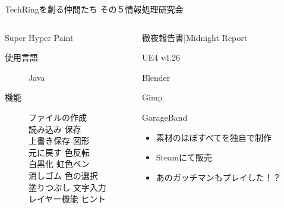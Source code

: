 \documentclass[dvipdfmx]{beamer}
\begin{document}
\begin{frame}{TechRingを創る仲間たち その５}{情報処理研究会}
  \begin{columns}
    \begin{column}{0.48\textwidth}
      \begin{alertblock}{Super Hyper Paint}
        \begin{footnotesize}
          \begin{description}
            \item[使用言語] Java
            \item[機能] ファイルの作成\\読み込み 保存\\上書き保存 図形\\
            元に戻す 色反転\\白黒化 虹色ペン\\消しゴム 色の選択\\塗りつぶし 文字入力\\レイヤー機能 ヒント
          \end{description}
        \end{footnotesize}
      \end{alertblock}
    \end{column}
    \begin{column}{0.48\textwidth}
      \begin{alertblock}{徹夜報告書|Midnight Report}
        \begin{footnotesize}
          \begin{description}[ゲームエンジン]
            \item[ゲームエンジン] UE4 v4.26
            \item[モデリング] Blender
            \item[画像処理] Gimp
            \item[音声作成] GarageBand 
          \end{description}
          \begin{itemize}
            \item 素材のほぼすべてを独自で制作
            \item Steamにて販売
            \item あのガッチマンもプレイした！？
          \end{itemize}
        \end{footnotesize}
      \end{alertblock}
    \end{column}
  \end{columns}


\end{frame}
\end{document}
